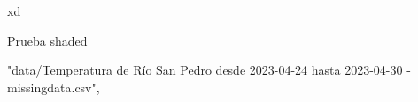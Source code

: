 xd

\tableofcontents

\begin{Shaded}
    Prueba shaded
\end{Shaded}

"data/Temperatura de Río San Pedro desde 2023-04-24 hasta 2023-04-30 - missingdata.csv",


